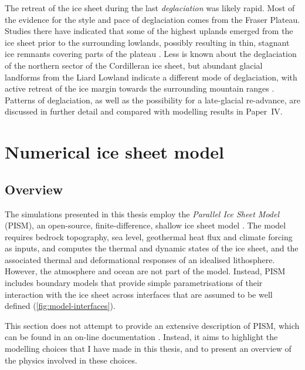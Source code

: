 \documentclass{article}
\newcommand{\CCYC}[0]{Paper~IV}     %
\begin{document}
The retreat of the ice sheet during the last \emph{deglaciation} was likely
rapid. Most of the evidence for the style and pace of deglaciation comes from
the Fraser Plateau. Studies there have indicated that some of the highest
uplands emerged from the ice sheet prior to the surrounding lowlands, possibly
resulting in thin, stagnant ice remnants covering parts of the plateau
\citep{Fulton.1967, Fulton.1991, Margold.etal.2011, Margold.etal.2013a}. Less
is known about the deglaciation of the northern sector of the Cordilleran ice
sheet, but abundant glacial landforms from the Liard Lowland indicate a
different mode of deglaciation, with active retreat of the ice margin towards
the surrounding mountain ranges \citep{Margold.etal.2013}. Patterns of
deglaciation, as well as the possibility for a late-glacial re-advance, are
discussed in further detail and compared with modelling results in
\CCYC.

\section{Numerical ice sheet model}

\subsection{Overview}

The simulations presented in this thesis employ the \emph{Parallel Ice Sheet
Model} (PISM), an open-source, finite-difference, shallow ice sheet model
\citep{PISM-authors.2014}. The model requires bedrock topography, sea level,
geothermal heat flux and climate forcing as inputs, and computes the thermal
and dynamic states of the ice sheet, and the associated thermal and
deformational responses of an idealised lithosphere. However, the atmosphere
and ocean are not part of the model. Instead, PISM includes boundary models
that provide simple parametrisations of their interaction with the ice sheet
across interfaces that are assumed to be well defined
(\cref{fig:model-interfaces}).

This section does not attempt to provide an extensive description of PISM,
which can be found in an on-line documentation
\citep[\url{http://www.pism-docs.org},][]{PISM-authors.2014}.
Instead, it aims to highlight the modelling choices that I have made in this
thesis, and to present an overview of the physics involved in these choices.
\end{document}
